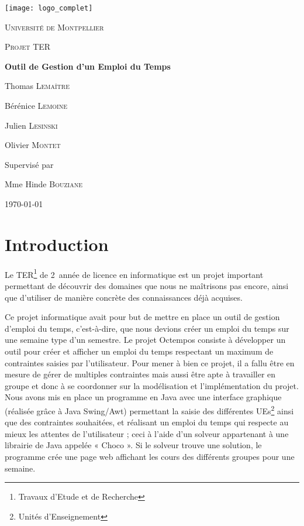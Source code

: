 \documentclass[12pt,a4paper]{article}
\begin{document}
\begin{titlepage}
	\centering
	\texttt{[image: logo\_complet]} 
	\par\vspace{1cm}
	{\scshape\LARGE Université de Montpellier \par}
	\vspace{1cm}
	{\scshape\Large Projet TER\par}
	\vspace{1.5cm}
	{\huge\bfseries Outil de Gestion d'un Emploi du Temps\par}
	\vspace{2cm}
	{\Large Thomas \textsc{Lemaître}\par}
	{\Large Bérénice \textsc{Lemoine}\par}
	{\Large Julien \textsc{Lesinski}\par}
	{\Large Olivier \textsc{Montet}\par}
	\vfill
	Supervisé par\par
	Mme Hinde \textsc{Bouziane}

	\vfill

	{\large \today\par}
\end{titlepage}

\renewcommand*\contentsname{Sommaire}
\setcounter{tocdepth}{2}

\tableofcontents

\newpage

\section{Introduction}

Le TER\footnote{Travaux d'Etude et de Recherche} de 2\ieme ~année de licence en informatique est un projet important permettant de découvrir des domaines que nous ne maîtrisons pas encore, ainsi que d’utiliser de manière concrète des connaissances déjà acquises.

Ce projet informatique avait pour but de mettre en place un outil de gestion d’emploi du temps, c’est-à-dire, que nous devions créer un emploi du temps sur une semaine type d’un semestre. Le projet Octempos consiste à développer un outil pour créer et afficher un emploi du temps respectant un maximum de contraintes saisies par l'utilisateur. Pour mener à bien ce projet, il a fallu être en mesure de gérer de multiples contraintes mais aussi être apte à travailler en groupe et donc à se coordonner sur la modélisation et l'implémentation du projet. Nous avons mis en place un programme en Java avec une interface graphique (réalisée grâce à Java Swing/Awt) permettant la saisie des différentes UEs\footnote{Unités d'Enseignement} ainsi que des contraintes souhaitées, et réalisant un emploi du temps qui respecte au mieux les attentes de l'utilisateur ; ceci à l’aide d’un solveur appartenant à une librairie de Java appelée « Choco ». Si le solveur trouve une solution, le programme crée une page web affichant les cours des différents groupes pour une semaine.
\end{document}

